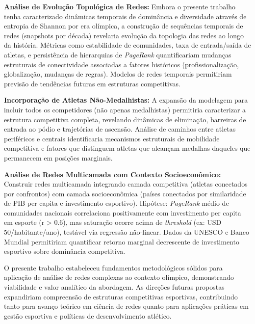 \textbf{Análise de Evolução Topológica de Redes:} Embora o presente trabalho tenha caracterizado dinâmicas temporais de dominância e diversidade através de entropia de Shannon por era olímpica, a construção de sequências temporais de redes (snapshots por década) revelaria evolução da topologia das redes ao longo da história. Métricas como estabilidade de comunidades, taxa de entrada/saída de atletas, e persistência de hierarquias de \textit{PageRank}{} quantificariam mudanças estruturais de conectividade associadas a fatores históricos (profissionalização, globalização, mudanças de regras). Modelos de redes temporais permitiriam previsão de tendências futuras em estruturas competitivas.

\textbf{Incorporação de Atletas Não-Medalhistas:} A expansão da modelagem para incluir todos os competidores (não apenas medalhistas) permitiria caracterizar a estrutura competitiva completa, revelando dinâmicas de eliminação, barreiras de entrada ao pódio e trajetórias de ascensão. Análise de caminhos entre atletas periféricos e centrais identificaria mecanismos estruturais de mobilidade competitiva e fatores que distinguem atletas que alcançam medalhas daqueles que permanecem em posições marginais.

\textbf{Análise de Redes Multicamada com Contexto Socioeconômico:} Construir redes multicamada integrando camada competitiva (atletas conectados por confrontos) com camada socioeconômica (países conectados por similaridade de PIB per capita e investimento esportivo). Hipótese: \textit{PageRank}{} médio de comunidades nacionais correlaciona positivamente com investimento per capita em esporte (r > 0.6), mas saturação ocorre acima de \textit{threshold} (ex: USD 50/habitante/ano), testável via regressão não-linear. Dados da UNESCO e Banco Mundial permitiriam quantificar retorno marginal decrescente de investimento esportivo sobre dominância competitiva.

O presente trabalho estabeleceu fundamentos metodológicos sólidos para aplicação de análise de redes complexas ao contexto olímpico, demonstrando viabilidade e valor analítico da abordagem. As direções futuras propostas expandiriam compreensão de estruturas competitivas esportivas, contribuindo tanto para avanço teórico em ciência de redes quanto para aplicações práticas em gestão esportiva e políticas de desenvolvimento atlético.